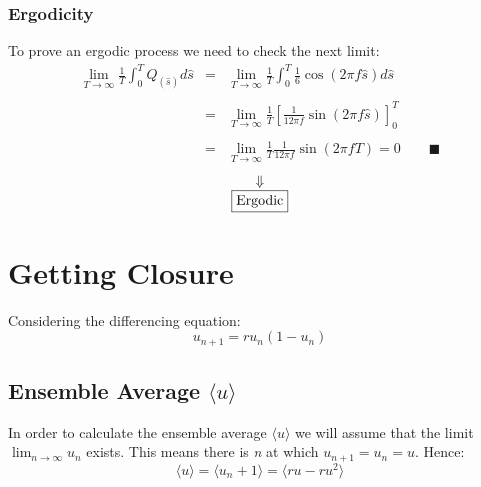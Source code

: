 \documentclass[11pt, a4paper]{article}
\begin{document}
\subsubsection{Ergodicity}
To prove an ergodic process we need to check the next limit:
\begin{equation}
    \begin{array}{rcl}
        \displaystyle \lim_{T\rightarrow\infty}\frac{1}{T}\int_{0}^{T}{Q_{\left(\hat{s}\right)}d\hat{s}} & = & \displaystyle \lim_{T\rightarrow\infty}\frac{1}{T}\int_{0}^{T}{\frac{1}{6}\cos\left(2\pi f\hat{s}\right)d\hat{s}} \\\\
        & = & \displaystyle \lim_{T\rightarrow\infty}\frac{1}{T}\left[\frac{1}{12\pi f}\sin\left(2\pi f\hat{s}\right)\right]_0^T \\\\
        & = & \displaystyle \lim_{T\rightarrow\infty}\frac{1}{T}\frac{1}{12\pi f}\sin\left(2\pi fT\right)=0\qquad\blacksquare
    \end{array}
\end{equation}
\begin{equation*}
    \begin{array}{c}
        \Downarrow \\
        \boxed{$\text{Ergodic}$}
    \end{array}
\end{equation*}

\newpage
\section{Getting Closure}
Considering the differencing equation:
\begin{equation}
    u_{n+1}=ru_n\left(1-u_n\right)
\end{equation}
\subsection{Ensemble Average $\langle u\rangle$}
In order to calculate the ensemble average $\langle u\rangle$ we will assume that the limit $\lim_{n\rightarrow\infty}{u_n}$ exists. This means there is \emph{n} at which $u_{n+1}=u_n=u$. Hence:
\begin{equation}
    \langle u\rangle=\langle u_n+1\rangle=\langle ru-ru^2\rangle
\end{equation}

\newpage
\end{document}

